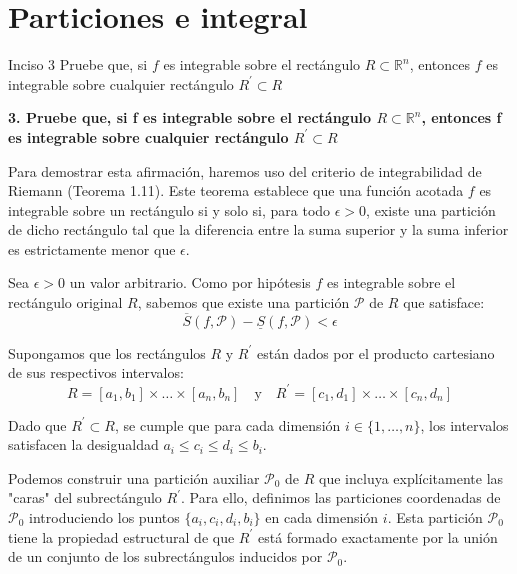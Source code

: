\documentclass[11pt,letterpaper]{article}
\begin{document}
\section*{Particiones e integral}

\begin{inciso}{Inciso 3}
Pruebe que, si $f$ es integrable sobre el rectángulo $R\subset\mathbb{R}^{n}$, entonces $f$ es integrable sobre cualquier rectángulo $R^{\prime}\subset R$
\end{inciso}
\textbf{3. Pruebe que, si f es integrable sobre el rectángulo $R\subset\mathbb{R}^{n}$, entonces f es integrable sobre cualquier rectángulo $R^{\prime}\subset R$}

Para demostrar esta afirmación, haremos uso del criterio de integrabilidad de Riemann (Teorema 1.11). Este teorema establece que una función acotada $f$ es integrable sobre un rectángulo si y solo si, para todo $\epsilon > 0$, existe una partición de dicho rectángulo tal que la diferencia entre la suma superior y la suma inferior es estrictamente menor que $\epsilon$.

Sea $\epsilon > 0$ un valor arbitrario. Como por hipótesis $f$ es integrable sobre el rectángulo original $R$, sabemos que existe una partición $\mathcal{P}$ de $R$ que satisface:
\begin{equation*}
\overline{S}(f,\mathcal{P}) - \underline{S}(f,\mathcal{P}) < \epsilon
\end{equation*}

Supongamos que los rectángulos $R$ y $R^{\prime}$ están dados por el producto cartesiano de sus respectivos intervalos:
\begin{equation*}
R = [a_{1}, b_{1}] \times \dots \times [a_{n}, b_{n}] \quad \text{y} \quad R^{\prime} = [c_{1}, d_{1}] \times \dots \times [c_{n}, d_{n}]
\end{equation*}

Dado que $R^{\prime} \subset R$, se cumple que para cada dimensión $i \in \{1, \dots, n\}$, los intervalos satisfacen la desigualdad $a_{i} \le c_{i} \le d_{i} \le b_{i}$. 

Podemos construir una partición auxiliar $\mathcal{P}_{0}$ de $R$ que incluya explícitamente las "caras" del subrectángulo $R^{\prime}$. Para ello, definimos las particiones coordenadas de $\mathcal{P}_{0}$ introduciendo los puntos $\{a_{i}, c_{i}, d_{i}, b_{i}\}$ en cada dimensión $i$. Esta partición $\mathcal{P}_{0}$ tiene la propiedad estructural de que $R^{\prime}$ está formado exactamente por la unión de un conjunto de los subrectángulos inducidos por $\mathcal{P}_{0}$.
\end{document}
